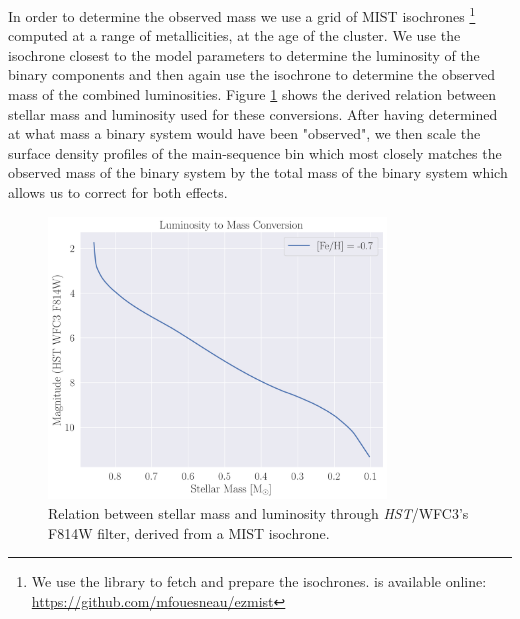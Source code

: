 In order to determine the observed mass we use a grid of MIST isochrones
\citep{Dotter2016,Choi2016}\footnote{We use the  library to fetch and prepare the
isochrones.  is available online: \url{https://github.com/mfouesneau/ezmist}} computed
at a range of metallicities, at the age of the cluster. We use the isochrone closest to the model
parameters to determine the luminosity of the binary components and then again use the isochrone to
determine the observed mass of the combined luminosities. Figure \ref{fig:2/isochrone} shows the
derived relation between stellar mass and luminosity used for these conversions. After having
determined at what mass a binary system would have been "observed", we then scale the surface
density profiles of the main-sequence bin which most closely matches the observed mass of the binary
system by the total mass of the binary system which allows us to correct for both effects.


\begin{figure}
    \centering
    \includegraphics[width=0.8\textwidth]{figures/isochrone_conversion.png}
    \caption{Relation between stellar mass and luminosity through \emph{HST}/WFC3's F814W filter,
        derived from a MIST isochrone.}
    \label{fig:2/isochrone}
\end{figure}